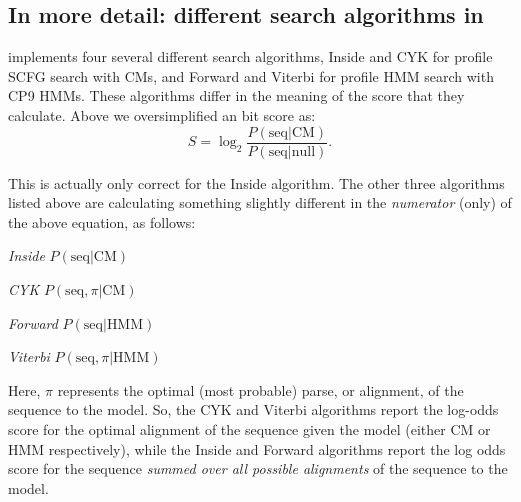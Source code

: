 \subsection{In more detail: different search algorithms in }
 implements four several different search 
algorithms, Inside and CYK for profile SCFG search with CMs, and
Forward and Viterbi for profile HMM search with CP9 HMMs.
These algorithms
differ in the meaning of the score that they calculate. Above we
oversimplified an  bit score as:
\[
	S = \log_2 \frac {P( \mbox{seq} | \mbox{CM})} { P (\mbox{seq} |
	\mbox{null})}.
\]

This is actually only correct for the Inside
algorithm. The other three algorithms listed above are calculating
something slightly different in the \emph{numerator} (only) of the
above equation, as follows: 

\begin{wideitem}
\item[\em{Inside}]  $P(\mbox{seq}      | \mbox{CM})$
\item[\em{CYK}]     $P(\mbox{seq},\pi  | \mbox{CM})$
\item[\em{Forward}] $P(\mbox{seq}      | \mbox{HMM})$
\item[\em{Viterbi}] $P(\mbox{seq},\pi  | \mbox{HMM})$
\end{wideitem}

Here, $\pi$ represents the optimal (most probable) parse, or
alignment, of the sequence to the model. So, the CYK and Viterbi
algorithms report the log-odds score for the optimal alignment 
of the sequence given the model (either CM or HMM respectively), while
the Inside and Forward algorithms report the log odds score for the
sequence \emph{summed over all possible alignments} of the sequence to
the model. 

